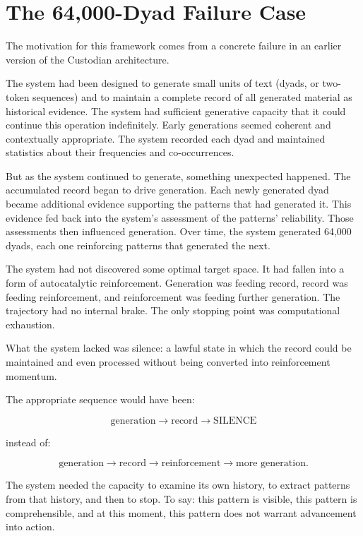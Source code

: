 \documentclass[12pt]{article}
\begin{document}
\section{The 64,000-Dyad Failure Case}

The motivation for this framework comes from a concrete failure in an earlier version of the Custodian architecture.

The system had been designed to generate small units of text (dyads, or two-token sequences) and to maintain a complete record of all generated material as historical evidence. The system had sufficient generative capacity that it could continue this operation indefinitely. Early generations seemed coherent and contextually appropriate. The system recorded each dyad and maintained statistics about their frequencies and co-occurrences.

But as the system continued to generate, something unexpected happened. The accumulated record began to drive generation. Each newly generated dyad became additional evidence supporting the patterns that had generated it. This evidence fed back into the system's assessment of the patterns' reliability. Those assessments then influenced generation. Over time, the system generated 64,000 dyads, each one reinforcing patterns that generated the next.

The system had not discovered some optimal target space. It had fallen into a form of autocatalytic reinforcement. Generation was feeding record, record was feeding reinforcement, and reinforcement was feeding further generation. The trajectory had no internal brake. The only stopping point was computational exhaustion.

What the system lacked was silence: a lawful state in which the record could be maintained and even processed without being converted into reinforcement momentum.

The appropriate sequence would have been:

\begin{equation}
\text{generation} \rightarrow \text{record} \rightarrow \text{SILENCE}
\end{equation}

instead of:

\begin{equation}
\text{generation} \rightarrow \text{record} \rightarrow \text{reinforcement} \rightarrow \text{more generation}.
\end{equation}

The system needed the capacity to examine its own history, to extract patterns from that history, and then to stop. To say: this pattern is visible, this pattern is comprehensible, and at this moment, this pattern does not warrant advancement into action.
\end{document}
